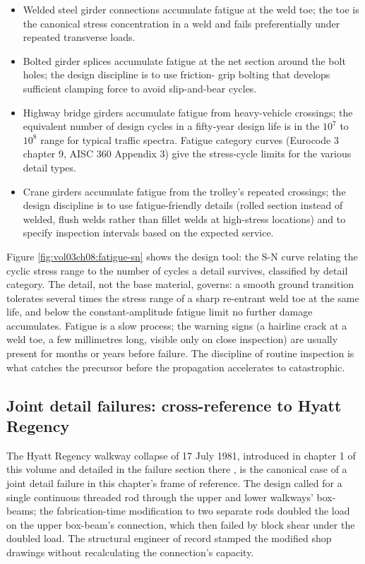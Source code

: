 \begin{itemize}[leftmargin=*]
  \item Welded steel girder connections accumulate fatigue at the
    weld toe; the toe is the canonical stress concentration in a
    weld and fails preferentially under repeated transverse loads.
  \item Bolted girder splices accumulate fatigue at the net section
    around the bolt holes; the design discipline is to use friction-
    grip bolting that develops sufficient clamping force to avoid
    slip-and-bear cycles.
  \item Highway bridge girders accumulate fatigue from heavy-vehicle
    crossings; the equivalent number of design cycles in a
    fifty-year design life is in the $10^7$ to $10^8$ range for
    typical traffic spectra. Fatigue category curves (Eurocode 3
    chapter 9, AISC 360 Appendix 3) give the stress-cycle limits
    for the various detail types.
  \item Crane girders accumulate fatigue from the trolley's repeated
    crossings; the design discipline is to use fatigue-friendly
    details (rolled section instead of welded, flush welds rather
    than fillet welds at high-stress locations) and to specify
    inspection intervals based on the expected service.
\end{itemize}



Figure \ref{fig:vol03ch08:fatigue-sn} shows the design tool: the S-N
curve relating the cyclic stress range to the number of cycles a detail
survives, classified by detail category. The detail, not the base
material, governs: a smooth ground transition tolerates several times
the stress range of a sharp re-entrant weld toe at the same life, and
below the constant-amplitude fatigue limit no further damage
accumulates. Fatigue is a slow process; the warning signs (a hairline
crack at a
weld toe, a few millimetres long, visible only on close inspection)
are usually present for months or years before failure. The
discipline of routine inspection is what catches the precursor
before the propagation accelerates to catastrophic.

\subsection{Joint detail failures: cross-reference to Hyatt Regency}

The Hyatt Regency walkway collapse of 17 July 1981, introduced in
chapter 1 of this volume and detailed in the failure section there
\cite{acc:nbs-hyatt-1982}, is the canonical case of a joint detail
failure in this chapter's frame of reference. The design called for
a single continuous threaded rod through the upper and lower
walkways' box-beams; the fabrication-time modification to two
separate rods doubled the load on the upper box-beam's connection,
which then failed by block shear under the doubled load. The
structural engineer of record stamped the modified shop drawings
without recalculating the connection's capacity.

